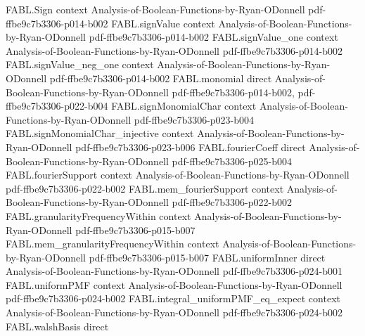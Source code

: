 \begin{theorem}
\label{FABL.FiniteFourierBasis.fourierComponentAtSupport_dependsOnly}
\leanok
{}
\proofstep
  {FABL.Sign}
  {context}
  {Analysis-of-Boolean-Functions-by-Ryan-ODonnell}
  {pdf-ffbe9c7b3306-p014-b002}
\proofstep
  {FABL.signValue}
  {context}
  {Analysis-of-Boolean-Functions-by-Ryan-ODonnell}
  {pdf-ffbe9c7b3306-p014-b002}
\proofstep
  {FABL.signValue_one}
  {context}
  {Analysis-of-Boolean-Functions-by-Ryan-ODonnell}
  {pdf-ffbe9c7b3306-p014-b002}
\proofstep
  {FABL.signValue_neg_one}
  {context}
  {Analysis-of-Boolean-Functions-by-Ryan-ODonnell}
  {pdf-ffbe9c7b3306-p014-b002}
\proofstep
  {FABL.monomial}
  {direct}
  {Analysis-of-Boolean-Functions-by-Ryan-ODonnell}
  {pdf-ffbe9c7b3306-p014-b002,
    pdf-ffbe9c7b3306-p022-b004}
\proofstep
  {FABL.signMonomialChar}
  {context}
  {Analysis-of-Boolean-Functions-by-Ryan-ODonnell}
  {pdf-ffbe9c7b3306-p023-b004}
\proofstep
  {FABL.signMonomialChar_injective}
  {context}
  {Analysis-of-Boolean-Functions-by-Ryan-ODonnell}
  {pdf-ffbe9c7b3306-p023-b006}
\proofstep
  {FABL.fourierCoeff}
  {direct}
  {Analysis-of-Boolean-Functions-by-Ryan-ODonnell}
  {pdf-ffbe9c7b3306-p025-b004}
\proofstep
  {FABL.fourierSupport}
  {context}
  {Analysis-of-Boolean-Functions-by-Ryan-ODonnell}
  {pdf-ffbe9c7b3306-p022-b002}
\proofstep
  {FABL.mem_fourierSupport}
  {context}
  {Analysis-of-Boolean-Functions-by-Ryan-ODonnell}
  {pdf-ffbe9c7b3306-p022-b002}
\proofstep
  {FABL.granularityFrequencyWithin}
  {context}
  {Analysis-of-Boolean-Functions-by-Ryan-ODonnell}
  {pdf-ffbe9c7b3306-p015-b007}
\proofstep
  {FABL.mem_granularityFrequencyWithin}
  {context}
  {Analysis-of-Boolean-Functions-by-Ryan-ODonnell}
  {pdf-ffbe9c7b3306-p015-b007}
\proofstep
  {FABL.uniformInner}
  {direct}
  {Analysis-of-Boolean-Functions-by-Ryan-ODonnell}
  {pdf-ffbe9c7b3306-p024-b001}
\proofstep
  {FABL.uniformPMF}
  {context}
  {Analysis-of-Boolean-Functions-by-Ryan-ODonnell}
  {pdf-ffbe9c7b3306-p024-b002}
\proofstep
  {FABL.integral_uniformPMF_eq_expect}
  {context}
  {Analysis-of-Boolean-Functions-by-Ryan-ODonnell}
  {pdf-ffbe9c7b3306-p024-b002}
\proofstep
  {FABL.walshBasis}
  {direct}

\end{theorem}

